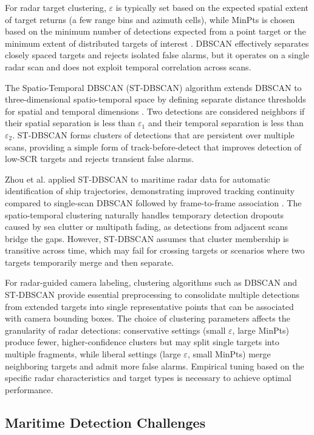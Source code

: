 For radar target clustering, $\varepsilon$ is typically set based on the expected spatial extent of target returns (a few range bins and azimuth cells), while MinPts is chosen based on the minimum number of detections expected from a point target or the minimum extent of distributed targets of interest \cite{Wang2022}. DBSCAN effectively separates closely spaced targets and rejects isolated false alarms, but it operates on a single radar scan and does not exploit temporal correlation across scans.

The Spatio-Temporal DBSCAN (ST-DBSCAN) algorithm extends DBSCAN to three-dimensional spatio-temporal space by defining separate distance thresholds for spatial and temporal dimensions \cite{birant2007stdbscan}. Two detections are considered neighbors if their spatial separation is less than $\varepsilon_1$ and their temporal separation is less than $\varepsilon_2$. ST-DBSCAN forms clusters of detections that are persistent over multiple scans, providing a simple form of track-before-detect that improves detection of low-SCR targets and rejects transient false alarms.

Zhou et al. applied ST-DBSCAN to maritime radar data for automatic identification of ship trajectories, demonstrating improved tracking continuity compared to single-scan DBSCAN followed by frame-to-frame association \cite{Zhou2024}. The spatio-temporal clustering naturally handles temporary detection dropouts caused by sea clutter or multipath fading, as detections from adjacent scans bridge the gaps. However, ST-DBSCAN assumes that cluster membership is transitive across time, which may fail for crossing targets or scenarios where two targets temporarily merge and then separate.

For radar-guided camera labeling, clustering algorithms such as DBSCAN and ST-DBSCAN provide essential preprocessing to consolidate multiple detections from extended targets into single representative points that can be associated with camera bounding boxes. The choice of clustering parameters affects the granularity of radar detections: conservative settings (small $\varepsilon$, large MinPts) produce fewer, higher-confidence clusters but may split single targets into multiple fragments, while liberal settings (large $\varepsilon$, small MinPts) merge neighboring targets and admit more false alarms. Empirical tuning based on the specific radar characteristics and target types is necessary to achieve optimal performance.

\subsection{Maritime Detection Challenges}

